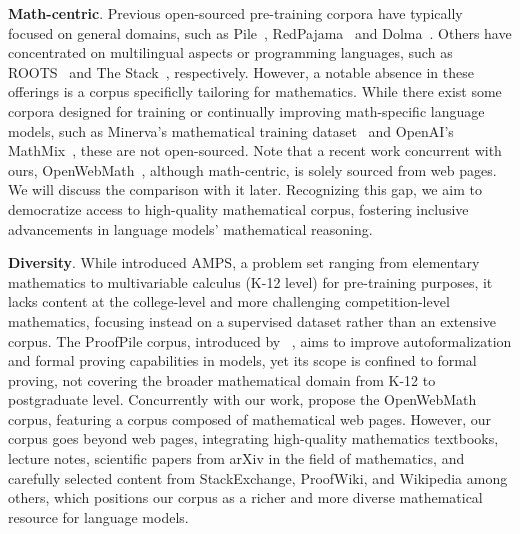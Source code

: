 \textbf{Math-centric}. Previous open-sourced pre-training corpora have typically focused on general domains, such as Pile~\citep{DBLP:journals/corr/abs-2101-00027-pile}, RedPajama~\citep{RedPajama} and Dolma~\citep{allenai-dolma}. Others have concentrated on multilingual aspects or programming languages, such as ROOTS~\citep{DBLP:conf/nips/LaurenconSWAMSW22-roots} and The Stack~\citep{DBLP:journals/corr/abs-2211-15533-stack}, respectively. However, a notable absence in these offerings is a corpus specificlly tailoring for mathematics. While there exist some corpora designed for training or continually improving math-specific language models, such as Minerva's mathematical training dataset~\citep{DBLP:conf/nips/LewkowyczADDMRS22-minerva} and  OpenAI's MathMix~\citep{DBLP:journals/corr/abs-2305-20050-lets-verify-step-by-step}, these are not open-sourced. Note that a recent work concurrent with ours, OpenWebMath~\citep{DBLP:journals/corr/abs-2310-06786-openwebmath}, although math-centric, is solely sourced from web pages. We will discuss the comparison with it later. Recognizing this gap, we aim to democratize access to high-quality mathematical corpus, fostering inclusive advancements in language models' mathematical reasoning.

\textbf{Diversity}. While \citet{DBLP:conf/nips/HendrycksBKABTS21-math} introduced AMPS, a problem set ranging from elementary mathematics to multivariable calculus (K-12 level) for pre-training purposes, it lacks content at the college-level and more challenging competition-level mathematics, focusing instead on a supervised dataset rather than an extensive corpus. The ProofPile corpus, introduced by~ \citet{DBLP:journals/corr/abs-2302-12433-proofpile}, aims to improve autoformalization and formal proving capabilities in models, yet its scope is confined to formal proving, not covering the broader mathematical domain from K-12 to postgraduate level. Concurrently with our work, \citet{DBLP:journals/corr/abs-2310-06786-openwebmath}
propose the OpenWebMath corpus, featuring a corpus composed of mathematical web pages. However, our corpus goes beyond web pages, integrating high-quality mathematics textbooks, lecture notes, scientific papers from arXiv in the field of mathematics, and carefully selected content from StackExchange, ProofWiki, and Wikipedia  among others, which positions our corpus as a richer and more diverse mathematical resource for language models.

